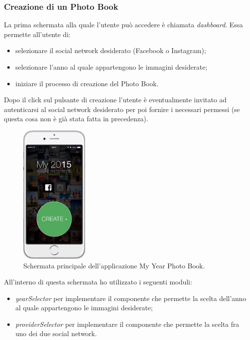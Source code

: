 			\subsubsection{Creazione di un Photo Book}
				La prima schermata alla quale l'utente può accedere è chiamata \emph{dashboard}. Essa permette all'utente di:
				\begin{itemize}
					\item selezionare il social network desiderato (Facebook o Instagram);
					\item selezionare l'anno al quale appartengono le immagini desiderate;
					\item iniziare il processo di creazione del Photo Book.
				\end{itemize}
				Dopo il click sul pulsante di creazione l'utente è eventualmente invitato ad autenticarsi al social network
				desiderato per poi fornire i necessari permessi (se questa cosa non è già stata fatta in precedenza).
				\begin{figure}[H]
					\centering
					\includegraphics[width=0.3\textwidth]{capitolo_3/immagini/schermata_principale.png}
					\caption{Schermata principale dell'applicazione My Year Photo Book.}
				\end{figure}
				All'interno di questa schermata ho utilizzato i seguenti moduli:
				\begin{itemize}
					\item \emph{yearSelector} per implementare il componente che permette la scelta dell'anno al quale
					appartengono le immagini desiderate;
					\item \emph{providerSelector} per implementare il componente che permette la scelta fra uno dei due social
					network.
				\end{itemize}
